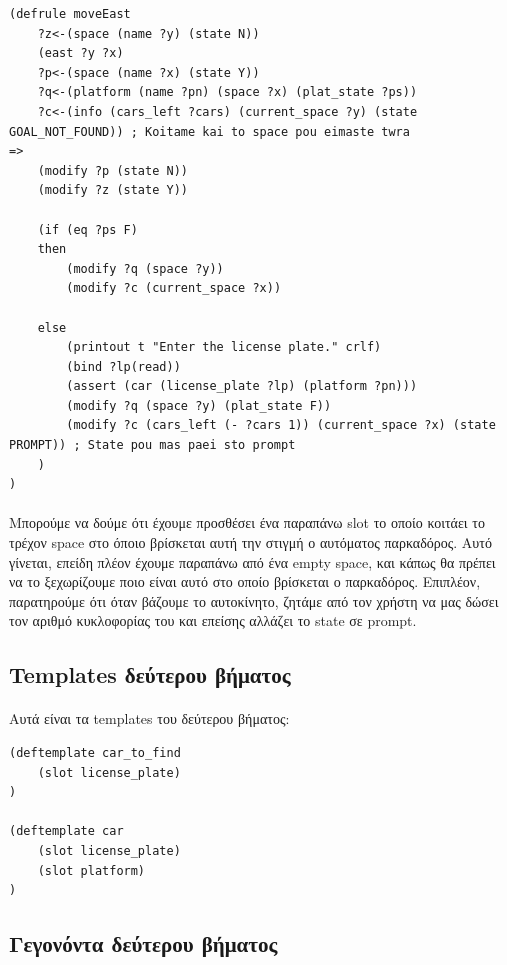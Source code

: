 \documentclass{article}
\begin{document}
    \begin{lstlisting}[caption=Τροποποιήμενος γενικός κανόνας κίνησης]
(defrule moveEast
    ?z<-(space (name ?y) (state N))
    (east ?y ?x)
    ?p<-(space (name ?x) (state Y))
    ?q<-(platform (name ?pn) (space ?x) (plat_state ?ps))
    ?c<-(info (cars_left ?cars) (current_space ?y) (state GOAL_NOT_FOUND)) ; Koitame kai to space pou eimaste twra
=>
    (modify ?p (state N))
    (modify ?z (state Y))
    
    (if (eq ?ps F)
    then
        (modify ?q (space ?y))
        (modify ?c (current_space ?x))
    
    else
        (printout t "Enter the license plate." crlf)
        (bind ?lp(read))
        (assert (car (license_plate ?lp) (platform ?pn)))
        (modify ?q (space ?y) (plat_state F))
        (modify ?c (cars_left (- ?cars 1)) (current_space ?x) (state PROMPT)) ; State pou mas paei sto prompt
    )
)
    \end{lstlisting}
    
    \paragraph{}
    Μπορούμε να δούμε ότι έχουμε προσθέσει ένα παραπάνω slot το οποίο κοιτάει το τρέχον space στο όποιο βρίσκεται
    αυτή την στιγμή ο αυτόματος παρκαδόρος. Αυτό γίνεται, επείδη πλέον έχουμε παραπάνω από ένα empty space, και
    κάπως θα πρέπει να το ξεχωρίζουμε ποιο είναι αυτό στο οποίο βρίσκεται ο παρκαδόρος. Επιπλέον, παρατηρούμε ότι
    όταν βάζουμε το αυτοκίνητο, ζητάμε από τον χρήστη να μας δώσει τον αριθμό κυκλοφορίας του και επείσης αλλάζει το state
    σε prompt.

    \subsection{Templates δεύτερου βήματος}
    \paragraph{}
    Αυτά είναι τα templates του δεύτερου βήματος:

    \begin{lstlisting}
(deftemplate car_to_find
    (slot license_plate)
)

(deftemplate car
    (slot license_plate)
    (slot platform)
)
    \end{lstlisting}

    \subsection{Γεγονόντα δεύτερου βήματος}
\end{document}
